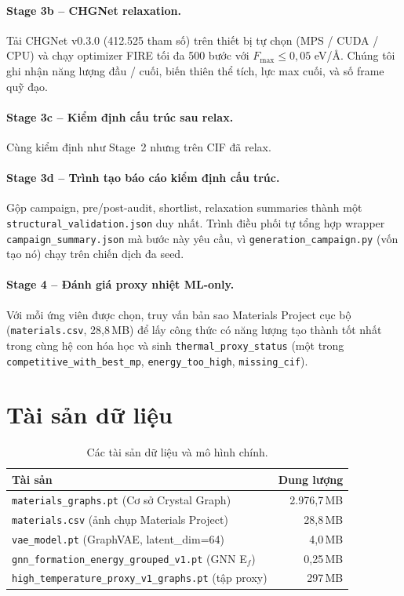 \documentclass[11pt,a4paper]{report}
\begin{document}
\paragraph{Stage 3b -- CHGNet relaxation.}
Tải CHGNet v0.3.0 (412.525 tham số) trên thiết bị tự chọn (MPS / CUDA / CPU) và chạy
optimizer FIRE tối đa 500 bước với $F_{\max}\leq0{,}05$ eV/\AA. Chúng tôi ghi nhận năng
lượng đầu / cuối, biến thiên thể tích, lực max cuối, và số frame quỹ đạo.

\paragraph{Stage 3c -- Kiểm định cấu trúc sau relax.}
Cùng kiểm định như Stage~2 nhưng trên CIF đã relax.

\paragraph{Stage 3d -- Trình tạo báo cáo kiểm định cấu trúc.}
Gộp campaign, pre/post-audit, shortlist, relaxation summaries thành một
\texttt{structural\_validation.json} duy nhất. Trình điều phối tự tổng hợp wrapper
\texttt{campaign\_summary.json} mà bước này yêu cầu, vì
\texttt{generation\_campaign.py} (vốn tạo nó) chạy trên chiến dịch đa seed.

\paragraph{Stage 4 -- Đánh giá proxy nhiệt ML-only.}
Với mỗi ứng viên được chọn, truy vấn bản sao Materials Project cục bộ
(\texttt{materials.csv}, 28{,}8\,MB) để lấy công thức có năng lượng tạo thành tốt nhất
trong cùng hệ con hóa học và sinh \texttt{thermal\_proxy\_status} (một trong
\texttt{competitive\_with\_best\_mp}, \texttt{energy\_too\_high}, \texttt{missing\_cif}).

\section{Tài sản dữ liệu}

\begin{table}[h]
\centering
\caption{Các tài sản dữ liệu và mô hình chính.}
\label{tab:assets}
\begin{tabular}{lr}
\toprule
\textbf{Tài sản} & \textbf{Dung lượng} \\
\midrule
\texttt{materials\_graphs.pt} (Cơ sở Crystal Graph) & 2.976{,}7\,MB \\
\texttt{materials.csv} (ảnh chụp Materials Project) & 28{,}8\,MB \\
\texttt{vae\_model.pt} (GraphVAE, latent\_dim=64) & 4{,}0\,MB \\
\texttt{gnn\_formation\_energy\_grouped\_v1.pt} (GNN E$_f$) & 0{,}25\,MB \\
\texttt{high\_temperature\_proxy\_v1\_graphs.pt} (tập proxy) & 297\,MB \\
\bottomrule
\end{tabular}
\end{table}
\end{document}
